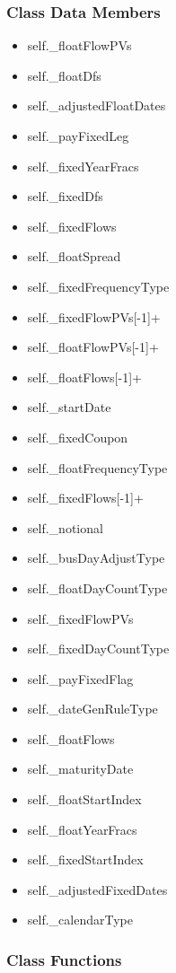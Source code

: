 \documentclass[twoside,11pt]{book}
\begin{document}
\subsubsection{Class Data Members}
\begin{itemize}
\item{self.\_floatFlowPVs}
\item{self.\_floatDfs}
\item{self.\_adjustedFloatDates}
\item{self.\_payFixedLeg}
\item{self.\_fixedYearFracs}
\item{self.\_fixedDfs}
\item{self.\_fixedFlows}
\item{self.\_floatSpread}
\item{self.\_fixedFrequencyType}
\item{self.\_fixedFlowPVs[-1]+}
\item{self.\_floatFlowPVs[-1]+}
\item{self.\_floatFlows[-1]+}
\item{self.\_startDate}
\item{self.\_fixedCoupon}
\item{self.\_floatFrequencyType}
\item{self.\_fixedFlows[-1]+}
\item{self.\_notional}
\item{self.\_busDayAdjustType}
\item{self.\_floatDayCountType}
\item{self.\_fixedFlowPVs}
\item{self.\_fixedDayCountType}
\item{self.\_payFixedFlag}
\item{self.\_dateGenRuleType}
\item{self.\_floatFlows}
\item{self.\_maturityDate}
\item{self.\_floatStartIndex}
\item{self.\_floatYearFracs}
\item{self.\_fixedStartIndex}
\item{self.\_adjustedFixedDates}
\item{self.\_calendarType}
\end{itemize}

\subsubsection{Class Functions}
\end{document}
